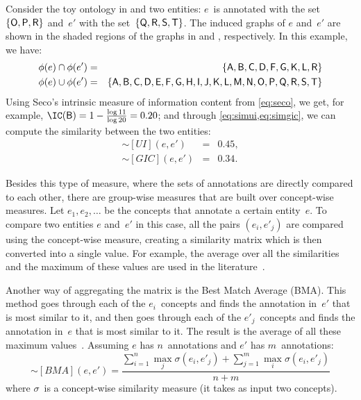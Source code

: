 Consider the toy ontology in  and two entities: $e$~is annotated with the set~$\{\protect\textsf O,\protect\textsf P,\protect\textsf R\}$ and~$e'$ with the set~$\{\protect\textsf Q,\protect\textsf R,\protect\textsf S,\protect\textsf T\}$. The induced graphs of $e$ and~$e'$ are shown in the shaded regions of the graphs in  and , respectively. In this example, we have:
\begin{eqnarray*}
    \phi(e) \cap \phi(e') &=& \{\protect\textsf A,\protect\textsf B,\protect\textsf C,\protect\textsf D,\protect\textsf F,\protect\textsf G,\protect\textsf K,\protect\textsf L,\protect\textsf R\} \\
    \phi(e) \cup \phi(e') &=& \{\protect\textsf A,\protect\textsf B,\protect\textsf C,\protect\textsf D,\protect\textsf E,\protect\textsf F,\protect\textsf G,\protect\textsf H,\protect\textsf I,\protect\textsf J,\protect\textsf K,\protect\textsf L,\protect\textsf M,\protect\textsf N,\protect\textsf O,\protect\textsf P,\protect\textsf Q,\protect\textsf R,\protect\textsf S,\protect\textsf T\}
\end{eqnarray*}
Using Seco's intrinsic measure of information content from \eqref{eq:seco}, we get, for example, $\IC(\term B) = 1 - \frac{\log 11}{\log 20}=0.20$; and through \eqref{eq:simui,eq:simgic}, we can compute the similarity between the two entities:
\begin{eqnarray*}
    \sim[UI](e,e')  &=& 0.45,\\
    \sim[GIC](e,e') &=& 0.34.
\end{eqnarray*}

Besides this type of measure, where the sets of annotations are directly compared to each other, there are group-wise measures that are built over concept-wise measures. Let $e_1,e_2,\ldots$ be the concepts that annotate a certain entity~$e$. To compare two entities $e$ and~$e'$ in this case, all the pairs $(e_i,e'_j)$ are compared using the concept-wise measure, creating a similarity matrix which is then converted into a single value. For example, the average over all the similarities and the maximum of these values are used in the literature~\citep{Lord2003,Grego2010}.

Another way of aggregating the matrix is the Best Match Average (BMA). This method goes through each of the $e_i$~concepts and finds the annotation in~$e'$ that is most similar to it, and then goes through each of the $e'_j$~concepts and finds the annotation in~$e$ that is most similar to it. The result is the average of all these maximum values~\citep{Wang2007,Pesquita2008,Grego2010}. Assuming $e$ has $n$~annotations and $e'$ has $m$~annotations:
\begin{equation}
    \sim[BMA](e,e') = \frac{
        \sum_{i=1}^n \max_{j} \sigma(e_i, e'_j) +
        \sum_{j=1}^m \max_{i} \sigma(e_i, e'_j)
    }{n + m}
    \label{eq:bma}
\end{equation}
where $\sigma$~is a concept-wise similarity measure (it takes as input two concepts).

